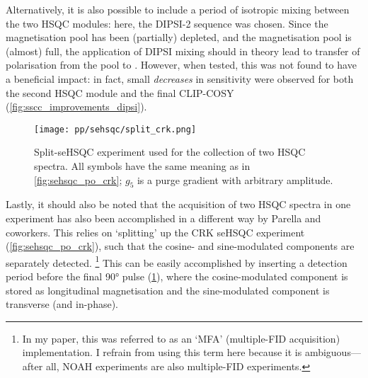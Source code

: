 Alternatively, it is also possible to include a period of isotropic mixing between the two HSQC modules: here, the DIPSI-2 sequence\autocite{Shaka1988JMR} was chosen.
Since the  magnetisation pool has been (partially) depleted, and the  magnetisation pool is (almost) full, the application of DIPSI mixing should in theory lead to transfer of polarisation from the  pool to .
However, when tested, this was not found to have a beneficial impact: in fact, small \textit{decreases} in sensitivity were observed for both the second HSQC module and the final CLIP-COSY (\cref{fig:sscc_improvements_dipsi}).

\begin{figure}[!ht]
    \centering
    \texttt{[image: pp/sehsqc/split\_crk.png]}%
    \caption[Split-seHSQC experiment]{
        Split-seHSQC experiment used for the collection of two HSQC spectra.\autocite{Nolis2019CPC}
        All symbols have the same meaning as in \cref{fig:sehsqc_po_crk}; $g_5$ is a purge gradient with arbitrary amplitude.
    }
    \label{fig:split_crk}
\end{figure}

Lastly, it should also be noted that the acquisition of two HSQC spectra in one experiment has also been accomplished in a different way by Parella and coworkers\autocite{Nolis2019CPC,Nolis2019JMR}.
This relies on `splitting' up the CRK seHSQC experiment (\cref{fig:sehsqc_po_crk}), such that the cosine- and sine-modulated components are separately detected.%
\footnote{In my paper\autocite{Yong2021JMR}, this was referred to as an `MFA' (multiple-FID acquisition) implementation. I refrain from using this term here because it is ambiguous---after all, NOAH experiments are also multiple-FID experiments.}
This can be easily accomplished by inserting a detection period before the final \proton{} \ang{90} pulse (\cref{fig:split_crk}), where the cosine-modulated component is stored as longitudinal magnetisation and the sine-modulated component is transverse (and in-phase).

